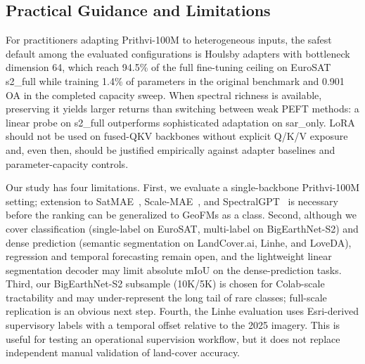 \subsection{Practical Guidance and Limitations}
For practitioners adapting Prithvi-100M to heterogeneous inputs, the safest default among the evaluated configurations is Houlsby adapters with bottleneck dimension 64, which reach 94.5\% of the full fine-tuning ceiling on EuroSAT s2\_full while training 1.4\% of parameters in the original benchmark and 0.901 OA in the completed capacity sweep. When spectral richness is available, preserving it yields larger returns than switching between weak PEFT methods: a linear probe on s2\_full outperforms sophisticated adaptation on sar\_only. LoRA should not be used on fused-QKV backbones without explicit Q/K/V exposure and, even then, should be justified empirically against adapter baselines and parameter-capacity controls.

Our study has four limitations. First, we evaluate a single-backbone Prithvi-100M setting; extension to SatMAE~\cite{cong2022satmae}, Scale-MAE~\cite{reed2023scalemae}, and SpectralGPT~\cite{hong2024spectralgpt} is necessary before the ranking can be generalized to GeoFMs as a class. Second, although we cover classification (single-label on EuroSAT, multi-label on BigEarthNet-S2) and dense prediction (semantic segmentation on LandCover.ai, Linhe, and LoveDA), regression and temporal forecasting remain open, and the lightweight linear segmentation decoder may limit absolute mIoU on the dense-prediction tasks. Third, our BigEarthNet-S2 subsample (10K/5K) is chosen for Colab-scale tractability and may under-represent the long tail of rare classes; full-scale replication is an obvious next step. Fourth, the Linhe evaluation uses Esri-derived supervisory labels with a temporal offset relative to the 2025 imagery. This is useful for testing an operational supervision workflow, but it does not replace independent manual validation of land-cover accuracy.
